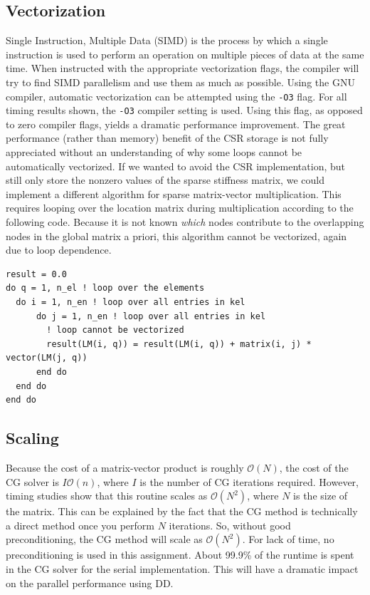 \documentclass[10pt]{article}
\begin{document}
\subsection{Vectorization}

Single Instruction, Multiple Data (SIMD) is the process by which a single instruction is used to perform an operation on multiple pieces of data at the same time. When instructed with the appropriate vectorization flags, the compiler will try to find SIMD parallelism and use them as much as possible. Using the GNU compiler, automatic vectorization can be attempted using the {\tt -O3} flag. For all timing results shown, the {\tt -O3} compiler setting is used. Using this flag, as opposed to zero compiler flags, yields a dramatic performance improvement. The great performance (rather than memory) benefit of the CSR storage is not fully appreciated without an understanding of why some loops cannot be automatically vectorized. If we wanted to avoid the CSR implementation, but still only store the nonzero values of the sparse stiffness matrix, we could implement a different algorithm for sparse matrix-vector multiplication. This requires looping over the location matrix during multiplication according to the following code. Because it is not known {\it which} nodes contribute to the overlapping nodes in the global matrix a priori, this algorithm cannot be vectorized, again due to loop dependence. 

\begin{lstlisting}
result = 0.0
do q = 1, n_el ! loop over the elements
  do i = 1, n_en ! loop over all entries in kel
      do j = 1, n_en ! loop over all entries in kel
        ! loop cannot be vectorized
        result(LM(i, q)) = result(LM(i, q)) + matrix(i, j) * vector(LM(j, q))
      end do
  end do
end do
\end{lstlisting}


\subsection{Scaling}
Because the cost of a matrix-vector product is roughly \(\mathscr{O}(N)\), the cost of the CG solver is \(I\mathscr{O}(n)\), where \(I\) is the number of CG iterations required. However, timing studies show that this routine scales as \(\mathscr{O}(N^2)\), where \(N\) is the size of the matrix. This can be explained by the fact that the CG method is technically a direct method once you perform \(N\) iterations. So, without good preconditioning, the CG method will scale as \(\mathscr{O}(N^2)\). For lack of time, no preconditioning is used in this assignment. About 99.9\% of the runtime is spent in the CG solver for the serial implementation. This will have a dramatic impact on the parallel performance using DD.  
\end{document}
